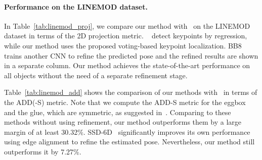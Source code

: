 \documentclass[10pt,twocolumn,letterpaper]{article}
\begin{document}
\paragraph{Performance on the LINEMOD dataset.} In Table~\ref{tab:linemod_proj}, we compare our method with~\cite{rad2017bb8, tekin2018real} on the LINEMOD dataset in terms of the 2D projection metric. ~\cite{rad2017bb8, tekin2018real} detect keypoints by regression, while our method uses the proposed voting-based keypoint localization. BB8~\cite{rad2017bb8} trains another CNN to refine the predicted pose and the refined results are shown in a separate column. Our method achieves the state-of-the-art performance on all objects without the need of a separate refinement stage.

Table~\ref{tab:linemod_add} shows the comparison of our methods with~\cite{rad2017bb8, liu2016ssd, tekin2018real} in terms of the ADD(-S) metric. Note that we compute the ADD-S metric for the eggbox and the glue, which are symmetric, as suggested in~\cite{xiang2017posecnn}. Comparing to these methods without using refinement, our method outperforms them by a large margin of at least 30.32\%. SSD-6D~\cite{kehl2017ssd} significantly improves its own performance using edge alignment to refine the estimated pose. Nevertheless, our method still outperforms it by 7.27\%.
\end{document}
